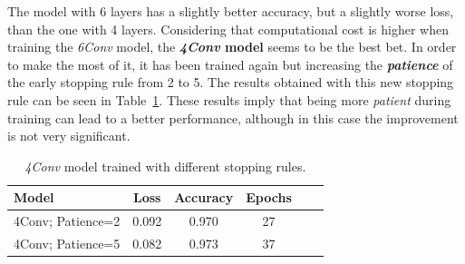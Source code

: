 The model with 6 layers has a slightly better accuracy, but a slightly worse loss, than the one with 4 layers. Considering that computational cost is higher when training the \textit{6Conv} model, the \textbf{\textit{4Conv} model} seems to be the best bet. In order to make the most of it, it has been trained again but increasing the \textbf{\textit{patience}} of the early stopping rule from 2 to 5. The results obtained with this new stopping rule can be seen in Table~\ref{tbl:arch_patience5}. These results imply that being more \textit{patient} during training can lead to a better performance, although in this case the improvement is not very significant.
\begin{table}
	\centering
	\begin{tabular}{l*{4}{c}r}
		\textbf{Model} & \textbf{Loss} & \textbf{Accuracy} & \textbf{Epochs} \\
		\hline
		4Conv; Patience=2 & 0.092 & 0.970 & 27 \\
		4Conv; Patience=5 & 0.082 & 0.973 & 37 \\
	\end{tabular}
	\caption{\textit{4Conv} model trained with different stopping rules.}
	\label{tbl:arch_patience5}
\end{table}
